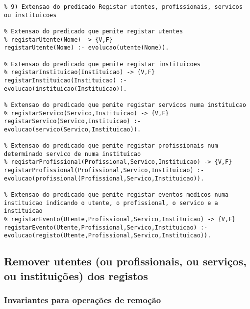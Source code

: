 \documentclass[
  oneside,
  10pt, a4paper,
  footinclude=true,
  headinclude=true,
  cleardoublepage=empty
]{scrbook}
\begin{document}
\begin{lstlisting}
% 9) Extensao do predicado Registar utentes, profissionais, servicos ou instituicoes

% Extensao do predicado que pemite registar utentes
% registarUtente(Nome) -> {V,F}
registarUtente(Nome) :- evolucao(utente(Nome)).

% Extensao do predicado que pemite registar instituicoes
% registarInstituicao(Instituicao) -> {V,F}
registarInstituicao(Instituicao) :- evolucao(instituicao(Instituicao)).

% Extensao do predicado que pemite registar servicos numa instituicao
% registarServico(Servico,Instituicao) -> {V,F}
registarServico(Servico,Instituicao) :- evolucao(servico(Servico,Instituicao)).

% Extensao do predicado que pemite registar profissionais num determinado servico de numa instituicao
% registarProfissional(Profissional,Servico,Instituicao) -> {V,F}
registarProfissional(Profissional,Servico,Instituicao) :- evolucao(profissional(Profissional,Servico,Instituicao)).

% Extensao do predicado que pemite registar eventos medicos numa instituicao indicando o utente, o profissional, o servico e a instituicao
% registarEvento(Utente,Profissional,Servico,Instituicao) -> {V,F}
registarEvento(Utente,Profissional,Servico,Instituicao) :- evolucao(registo(Utente,Profissional,Servico,Instituicao)).
\end{lstlisting}


\subsection{Remover utentes (ou profissionais, ou serviços, ou instituições) dos registos}
\label{remocao}

\subsubsection{Invariantes para operações de remoção}
\label{invariantes_remocao}
\end{document}

